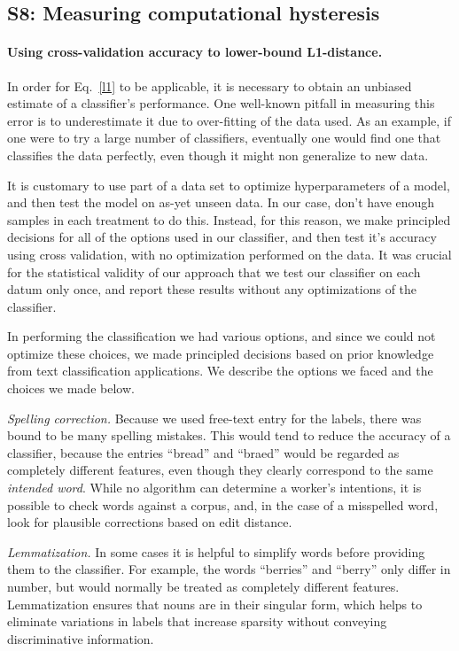 \documentclass[12pt]{article}
\begin{document}
\subsection*{S8: Measuring computational hysteresis}
	\paragraph{Using cross-validation accuracy to lower-bound L1-distance.}
	In order for Eq.~\ref{l1} to be applicable, it is necessary to obtain
	an unbiased estimate of a classifier's performance.  One well-known
	pitfall in measuring this error is to underestimate it due to 
	over-fitting of the data used.  As an example, if one were to try 
	a large number of classifiers, eventually one would find one that
	classifies the data perfectly, even though it might non generalize to
	new data.

	It is customary to use part of a data set to optimize hyperparameters of
	a model, and then test the model on as-yet unseen data.  In our case,
	don't have enough samples in each treatment to do this.  Instead, for 
	this reason, we make principled decisions for all of the options used
	in our classifier, and then test it's accuracy using cross validation,
	with no optimization performed on the data.  It was crucial for 
	the statistical validity of our approach that we test our classifier on 
	each datum only once, and report these results without any optimizations
	of the classifier.

	In performing the classification we had various options, and since we
	could not optimize these choices, we made principled decisions based on
	prior knowledge from text classification applications.  We describe the
	options we faced and the choices we made below.

	\textit{Spelling correction.}  Because we used free-text
	entry for the labels, there was bound to be many spelling mistakes.
	This would tend to reduce the accuracy of a classifier, because the 
	entries ``bread'' and ``braed'' would be regarded as completely different
	features, even though they clearly correspond to the same 
	\textit{intended word}.  While no algorithm can determine a worker's 
	intentions, it is possible to check words against a corpus, and, in the
	case of a misspelled word, look for plausible corrections based on 
	edit distance.

	\textit{Lemmatization.}  In some cases it is helpful to simplify words 
	before providing them to the classifier.  For example, the words 
	``berries'' and ``berry'' only differ in number, but would normally be
	treated as completely different features.  Lemmatization ensures that
	nouns are in their singular form, which helps to eliminate variations in
	labels that increase sparsity without conveying discriminative 
	information.
\end{document}
